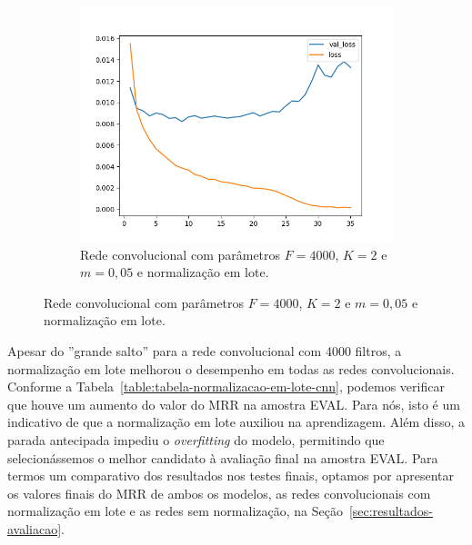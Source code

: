 \begin{figure}[H]
\begin{subfigure}{.5\textwidth}
  \label{fig:cnn-4000-k-2-m-005}
\end{subfigure}
\begin{subfigure}{.5\textwidth}
  \centering
  \caption{Rede convolucional com parâmetros $F = 4000$, $K = 2$ e $m = 0,05$ e normalização em lote.}
  \includegraphics[width=.8\linewidth]{figuras/ape-ajustes-hiper-parametros/cnn-with-bn-4000-k-2-m-005.png}
  
  \label{fig:cnn-4000-k-2-m-005-normalizacao-em-lote}
\end{subfigure}

\label{fig:treinamento-cnn-normalizacao-em-lote}
\end{figure}

Apesar do ''grande salto'' para a rede convolucional com 4000 filtros, a normalização em lote melhorou o desempenho em todas as redes convolucionais. Conforme a Tabela~\ref{table:tabela-normalizacao-em-lote-cnn}, podemos verificar que houve um aumento do valor do MRR na amostra EVAL. Para nós, isto é um indicativo de que a normalização em lote auxiliou na aprendizagem. Além disso, a parada antecipada impediu o \textit{overfitting} do modelo, permitindo que selecionássemos o melhor candidato à avaliação final na amostra EVAL. Para termos um comparativo dos resultados nos testes finais, optamos por apresentar os valores finais do MRR de ambos os modelos, as redes convolucionais com normalização em lote e as redes sem normalização, na Seção~\ref{sec:resultados-avaliacao}.

